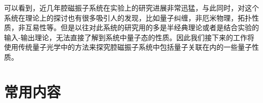 可以看到，近几年腔磁振子系统在实验上的研究进展非常迅猛，与此同时，对这个系统在理论上的探讨也有很多吸引人的发现，比如量子纠缠，非厄米物理，拓扑性质，非互易性等。但是以往对此系统的研究用的多是半经典理论或者是结合实验的输入-输出理论，无法直接了解到系统中量子态的性质。因此我们接下来的工作将使用传统量子光学中的方法来探究腔磁振子系统中包括量子关联在内的一些量子性质。

\section{常用内容}
